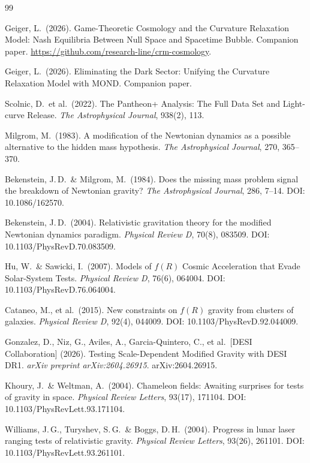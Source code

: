 \documentclass[11pt,a4paper]{article}
\begin{document}
\begin{thebibliography}{99}

Geiger, L.\ (2026).
Game-Theoretic Cosmology and the Curvature Relaxation Model: Nash Equilibria Between Null Space and Spacetime Bubble.
Companion paper. \url{https://github.com/research-line/crm-cosmology}.

Geiger, L.\ (2026).
Eliminating the Dark Sector: Unifying the Curvature Relaxation Model with MOND.
Companion paper.

Scolnic, D.\ et al.\ (2022).
The Pantheon+ Analysis: The Full Data Set and Light-curve Release.
\textit{The Astrophysical Journal}, 938(2), 113.

Milgrom, M.\ (1983).
A modification of the Newtonian dynamics as a possible alternative to the hidden mass hypothesis.
\textit{The Astrophysical Journal}, 270, 365--370.

Bekenstein, J.\,D.\ \& Milgrom, M.\ (1984).
Does the missing mass problem signal the breakdown of Newtonian gravity?
\textit{The Astrophysical Journal}, 286, 7--14.
DOI: 10.1086/162570.

Bekenstein, J.\,D.\ (2004).
Relativistic gravitation theory for the modified Newtonian dynamics paradigm.
\textit{Physical Review D}, 70(8), 083509.
DOI: 10.1103/PhysRevD.70.083509.

Hu, W.\ \& Sawicki, I.\ (2007).
Models of $f(R)$ Cosmic Acceleration that Evade Solar-System Tests.
\textit{Physical Review D}, 76(6), 064004.
DOI: 10.1103/PhysRevD.76.064004.

Cataneo, M., et al.\ (2015).
New constraints on $f(R)$ gravity from clusters of galaxies.
\textit{Physical Review D}, 92(4), 044009.
DOI: 10.1103/PhysRevD.92.044009.

Gonzalez, D., Niz, G., Aviles, A., Garcia-Quintero, C., et al.\ [DESI Collaboration] (2026).
Testing Scale-Dependent Modified Gravity with DESI DR1.
\textit{arXiv preprint arXiv:2604.26915}.
arXiv:2604.26915.

Khoury, J.\ \& Weltman, A.\ (2004).
Chameleon fields: Awaiting surprises for tests of gravity in space.
\textit{Physical Review Letters}, 93(17), 171104.
DOI: 10.1103/PhysRevLett.93.171104.

Williams, J.\,G., Turyshev, S.\,G.\ \& Boggs, D.\,H.\ (2004).
Progress in lunar laser ranging tests of relativistic gravity.
\textit{Physical Review Letters}, 93(26), 261101.
DOI: 10.1103/PhysRevLett.93.261101.


\end{thebibliography}
\end{document}
